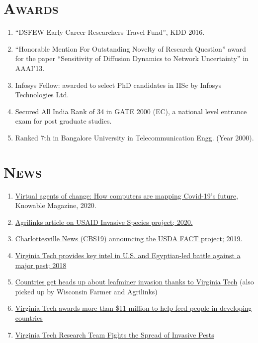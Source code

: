 \documentclass[margin,10pt]{res} %
\begin{document}
\begin{resume}
\section{\textnormal{\textsc{Awards}}}
\begin{enumerate}[$\circ$]
   \item ``DSFEW Early Career Researchers Travel Fund'', KDD 2016.
\item ``Honorable Mention For Outstanding Novelty of Research
Question'' award for the paper ``Sensitivity of Diffusion Dynamics to
Network Uncertainty'' in AAAI'13.
\item Infosys Fellow: awarded to select
PhD candidates in IISc by Infosys Technologies Ltd. 
\item Secured All India Rank of 34 in GATE 2000 (EC), a national level
entrance exam for post graduate studies.
\item Ranked 7th in Bangalore University in Telecommunication Engg. (Year 2000).
\end{enumerate}
\section{\textnormal{\textsc{News}}}
\begin{enumerate}[$\circ$]
\item 
\href{https://knowablemagazine.org/article/technology/2020/virtual-agents-change-how-computers-are-mapping-covid19s-future}{Virtual
agents of change: How computers are mapping Covid-19’s future}, Knowable
Magazine, 2020.
\item
\href{https://www.agrilinks.org/post/q-why-mapping-spread-invasive-species-above-so-important-prevention-efforts-below}{Agrilinks
article on USAID Invasive Species project; 2020.}
\item
\href{https://www.cbs19news.com/story/41855331/grant-to-help-model-potential-arrival-of-invasive-species-and-protect-tomato-crops?utm_source=cmpgn_news&utm_medium=email&utm_campaign=vtUnirelNewsDailyCMP_031320-f%2Fs}{Charlottesville
News (CBS19) announcing the USDA FACT project; 2019.}
\item
\href{https://vtnews.vt.edu/articles/2018/03/outreach-ipmegyptfaw.html}{Virginia
Tech provides key intel in U.S. and Egyptian-led battle against a major
pest; 2018}
\item
\href{https://vtnews.vt.edu/articles/2018/02/outreach-ipmnexus.html}{Countries
get heads up about leafminer invasion thanks to Virginia Tech} (also picked
up by Wisconsin Farmer and Agrilinks)
\item
\href{https://vtnews.vt.edu/articles/2016/05/outreach-oiredinnovationlabawards.html}{Virginia Tech awards more than \$11 million to help feed people in
developing countries}
\item
\href{https://www.bi.vt.edu/ndssl/news/virginia-tech-research-team-fights-the-spread-of-invasive-pests}{Virginia
Tech Research Team Fights the Spread of Invasive Pests}
\end{enumerate}

\end{resume}
\end{document}
